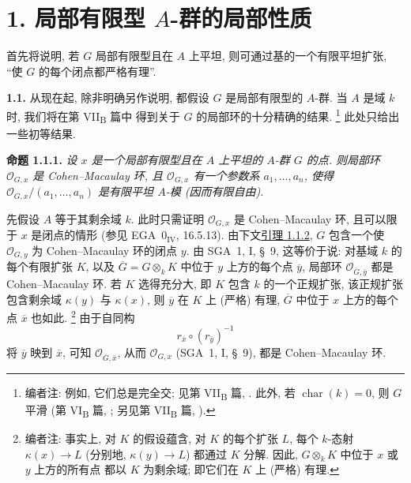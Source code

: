 
\section*{1. 局部有限型 \(A\)-群的局部性质}
\label{sec:sga3-VIA-1}

首先将说明, 若 \(G\) 局部有限型且在 \(A\) 上平坦,
则可通过基的一个有限平坦扩张,
``使 \(G\) 的每个闭点都严格有理''.

\medskip
{}\label{par:sga3-VIA-1.1}%
\noindent\textbf{1.1.}
从现在起, 除非明确另作说明,
都假设 \(G\) 是局部有限型的 \(A\)-群.
当 \(A\) 是域 \(k\) 时, 我们将在第 VII\textsubscript{B} 篇中
得到关于 \(G\) 的局部环的十分精确的结果.%
\footnote{\label{note:sga3-VIA-10}编者注: 例如, 它们总是完全交;
见第 VII\textsubscript{B} 篇, .
此外, 若 \(\operatorname{char}(k)=0\), 则 \(G\) 平滑
(第 VI\textsubscript{B} 篇, ;
另见第 VII\textsubscript{B} 篇, ).}
此处只给出一些初等结果.

\medskip
{}\label{prop:sga3-VIA-1.1.1}%
\noindent\textbf{命题 1.1.1.}
\textit{设 \(x\) 是一个局部有限型且在 \(A\) 上平坦的
\(A\)-群 \(G\) 的点.
则局部环 \(\mathcal O_{G,x}\) 是 Cohen--Macaulay 环,
且 \(\mathcal O_{G,x}\) 有一个参数系 \(a_1,\ldots,a_n\),
使得 \(\mathcal O_{G,x}/(a_1,\ldots,a_n)\) 是有限平坦
\(A\)-模 (因而有限自由).}

\medskip
先假设 \(A\) 等于其剩余域 \(k\).
此时只需证明 \(\mathcal O_{G,x}\) 是 Cohen--Macaulay 环,
且可以限于 \(x\) 是闭点的情形
(参见 EGA~\(0_{\mathrm{IV}}\), 16.5.13).
由下文\hyperref[lem:sga3-VIA-1.1.2]{引理 1.1.2},
\(G\) 包含一个使 \(\mathcal O_{G,y}\) 为 Cohen--Macaulay 环的闭点 \(y\).
由 SGA~1, I, \S~9, 这等价于说:
对基域 \(k\) 的每个有限扩张 \(K\),
以及 \(\overline G=G\otimes_k K\) 中位于 \(y\) 上方的每个点
\(\overline y\), 局部环 \(\mathcal O_{\overline G,\overline y}\)
都是 Cohen--Macaulay 环.
若 \(K\) 选得充分大, 即 \(K\) 包含 \(k\) 的一个正规扩张,
该正规扩张包含剩余域 \(\kappa(y)\) 与 \(\kappa(x)\),
则 \(\overline y\) 在 \(K\) 上 (严格) 有理,
\(\overline G\) 中位于 \(x\) 上方的每个点 \(\overline x\) 也如此.%
\footnote{\label{note:sga3-VIA-11}编者注: 事实上, 对 \(K\) 的假设蕴含,
对 \(K\) 的每个扩张 \(L\), 每个 \(k\)-态射
\(\kappa(x)\to L\) (分别地, \(\kappa(y)\to L\))
都通过 \(K\) 分解.
因此, \(G\otimes_k K\) 中位于 \(x\) 或 \(y\) 上方的所有点
都以 \(K\) 为剩余域; 即它们在 \(K\) 上 (严格) 有理.}
由于自同构
\[
  r_{\overline x}\circ(r_{\overline y})^{-1}
\]
将 \(\overline y\) 映到 \(\overline x\),
可知 \(\mathcal O_{\overline G,\overline x}\),
从而 \(\mathcal O_{G,x}\) (SGA~1, I, \S~9), 都是 Cohen--Macaulay 环.

